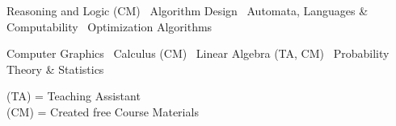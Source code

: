 \documentclass[]{deedy-resume-openfont}
\begin{document}
\begin{minipage}[t]{0.33\textwidth}
\begin{small}
Reasoning and Logic (CM) \textbullet \
Algorithm Design \textbullet \
Automata, Languages \& Computability \textbullet \
Optimization Algorithms
\vspace{0.8\topsep}
\end{small}

\begin{small}
Computer Graphics \textbullet \
Calculus (CM) \textbullet \
Linear Algebra (TA, CM) \textbullet \
Probability Theory \& Statistics
\vspace{0.8\topsep}
\end{small}

(TA) = Teaching Assistant \\
(CM) = Created free Course Materials

%
%

\end{minipage} 
\hfill
\end{document}
